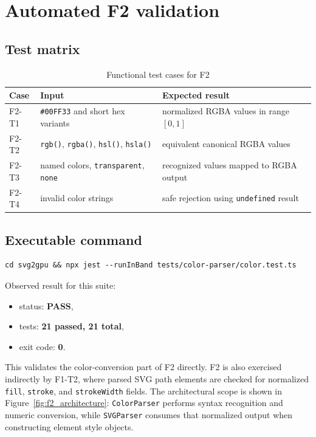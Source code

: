 \section{Automated F2 validation}

\subsection{Test matrix}

\begin{table}[htbp]
\centering
\caption{Functional test cases for F2}
\label{tab:f2_matrix}
\begin{tabular}{>{\raggedright\arraybackslash}p{1.8cm} >{\raggedright\arraybackslash}p{4.0cm} >{\raggedright\arraybackslash}p{6.6cm}}
\toprule
\textbf{Case} & \textbf{Input} & \textbf{Expected result} \\
\midrule
F2-T1 & \texttt{\#00FF33} and short hex variants & normalized RGBA values in range $[0,1]$ \\
F2-T2 & \texttt{rgb()}, \texttt{rgba()}, \texttt{hsl()}, \texttt{hsla()} & equivalent canonical RGBA values \\
F2-T3 & named colors, \texttt{transparent}, \texttt{none} & recognized values mapped to RGBA output \\
F2-T4 & invalid color strings & safe rejection using \texttt{undefined} result \\
\bottomrule
\end{tabular}
\end{table}

\subsection{Executable command}

\begin{verbatim}
cd svg2gpu && npx jest --runInBand tests/color-parser/color.test.ts
\end{verbatim}

Observed result for this suite:

\begin{itemize}
\item status: \textbf{PASS},
\item tests: \textbf{21 passed, 21 total},
\item exit code: \textbf{0}.
\end{itemize}

This validates the color-conversion part of F2 directly.
F2 is also exercised indirectly by F1-T2, where parsed SVG path elements are checked for normalized \texttt{fill}, \texttt{stroke}, and \texttt{strokeWidth} fields.
The architectural scope is shown in Figure~\ref{fig:f2_architecture}: \texttt{ColorParser} performs syntax recognition and numeric conversion, while \texttt{SVGParser} consumes that normalized output when constructing element style objects.

